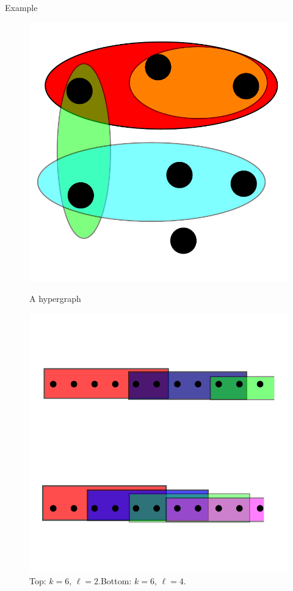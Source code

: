 \documentclass{beamer}
\theoremstyle{plain}
\begin{document}
	\begin{frame}{Example}
		\begin{figure}
			\begin{overprint}
				\centering\includegraphics[scale=.5]{hyper.pdf}\caption{A hypergraph}
				\centering\includegraphics[scale=.5]{hyper_cycles.pdf}\caption{Top: $k = 6$, $\ell = 2$.\quad Bottom: $k = 6$, $\ell = 4$.}
			\end{overprint}
		\end{figure}
	\end{frame}
\end{document}

